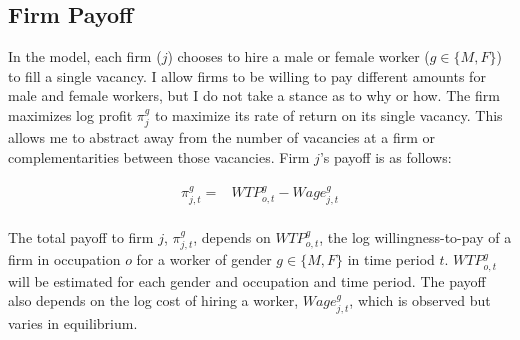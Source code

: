 \documentclass[12pt]{article}
\begin{document}
\subsection{Firm Payoff}


In the model, each firm ($j$) chooses to hire a male or female worker ($g \in \{M,F\}$) to fill a single vacancy. I allow firms to be willing to pay different amounts for male and female workers, but I do not take a stance as to why or how. The firm maximizes log profit $\pi^g_j$ to maximize its rate of return on its single vacancy. This allows me to abstract away from the number of vacancies at a firm or complementarities between those vacancies. Firm $j$'s payoff is as follows:


\begin{align} \label{logfirm}
\pi^g_{j,t}=&  WTP^g_{o,t} -  Wage^g_{j,t}  \\ \nonumber
\end{align}




The total payoff to firm $j$, $\pi^g_{j,t}$, depends on $WTP^g_{o,t}$, the log willingness-to-pay of a firm in occupation $o$ for a worker of gender $g  \in \{M,F\}$ in time period $t$. $WTP^g_{o,t}$ will be estimated for each gender and occupation and time period. The payoff also depends on the log cost of hiring a worker, ${Wage^g_{j,t}}$, which is observed but varies in equilibrium. 
\end{document}
